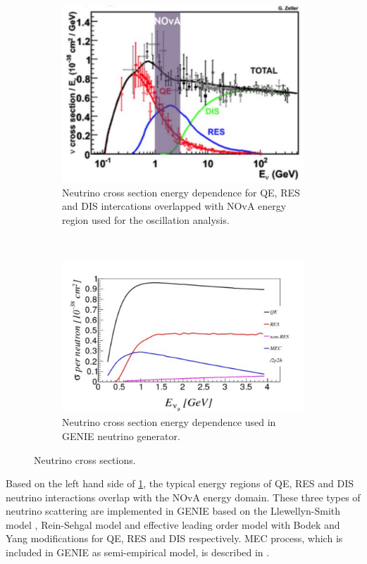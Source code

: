 \begin{figure}[t!]
\begin{subfigure}[t]{.5\textwidth}
  \centering
  \includegraphics[width=0.85\linewidth]{figures/nu_channels.pdf}
  \caption{Neutrino cross section energy dependence for QE, RES and DIS intercations overlapped with 
	NOvA energy region used for the oscillation analysis.}
  \label{fig:NovaEReg}
\end{subfigure}%
~
\begin{subfigure}[t]{.5\textwidth}
  \centering
  \includegraphics[width=1.1\linewidth]{figures/mec_xsec.pdf}
  \caption{Neutrino cross section energy dependence used in GENIE neutrino generator.}
  \label{fig:mecXsec}
\end{subfigure}
\caption{Neutrino cross sections.}
\label{fig:simPlots}
\end{figure}

Based on the left hand side of \ref{fig:NovaEReg}, the typical energy regions of QE, RES and DIS neutrino 
interactions overlap with the NOvA energy domain. These three types of neutrino scattering are implemented 
in GENIE based on the Llewellyn-Smith model \cite{QE}, Rein-Sehgal model \cite{RES} and effective leading 
order model with Bodek and Yang modifications \cite{DIS} for QE, RES and DIS respectively. MEC process, 
which is included in GENIE as semi-empirical model, is described in \cite{MEC}.

